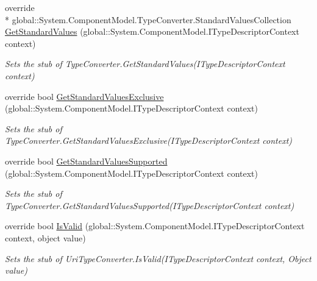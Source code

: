 \begin{DoxyCompactItemize}
override \\*
global\-::\-System.\-Component\-Model.\-Type\-Converter.\-Standard\-Values\-Collection \hyperlink{class_system_1_1_fakes_1_1_stub_uri_type_converter_a56af0d9f67986132f4ee1c4770fe7859}{Get\-Standard\-Values} (global\-::\-System.\-Component\-Model.\-I\-Type\-Descriptor\-Context context)
\begin{DoxyCompactList}\small\item\em Sets the stub of Type\-Converter.\-Get\-Standard\-Values(\-I\-Type\-Descriptor\-Context context)\end{DoxyCompactList}\item 
override bool \hyperlink{class_system_1_1_fakes_1_1_stub_uri_type_converter_aa7b8825e4a8ed4820148143dfe0d55a9}{Get\-Standard\-Values\-Exclusive} (global\-::\-System.\-Component\-Model.\-I\-Type\-Descriptor\-Context context)
\begin{DoxyCompactList}\small\item\em Sets the stub of Type\-Converter.\-Get\-Standard\-Values\-Exclusive(\-I\-Type\-Descriptor\-Context context)\end{DoxyCompactList}\item 
override bool \hyperlink{class_system_1_1_fakes_1_1_stub_uri_type_converter_ad9531eb1977a425a7752596ad9b7c9f1}{Get\-Standard\-Values\-Supported} (global\-::\-System.\-Component\-Model.\-I\-Type\-Descriptor\-Context context)
\begin{DoxyCompactList}\small\item\em Sets the stub of Type\-Converter.\-Get\-Standard\-Values\-Supported(\-I\-Type\-Descriptor\-Context context)\end{DoxyCompactList}\item 
override bool \hyperlink{class_system_1_1_fakes_1_1_stub_uri_type_converter_a53a9ff0de3a9f9a8ce80f3062b0fbec5}{Is\-Valid} (global\-::\-System.\-Component\-Model.\-I\-Type\-Descriptor\-Context context, object value)
\begin{DoxyCompactList}\small\item\em Sets the stub of Uri\-Type\-Converter.\-Is\-Valid(\-I\-Type\-Descriptor\-Context context, Object value)\end{DoxyCompactList}\end{DoxyCompactItemize}
